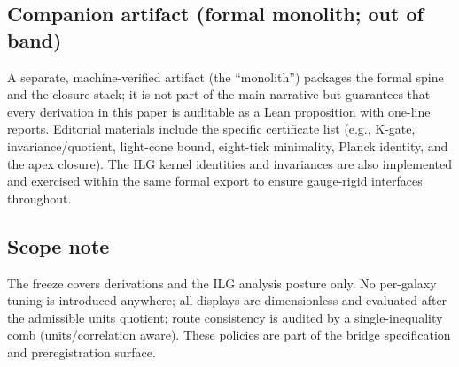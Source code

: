 \documentclass[11pt]{article}
\begin{document}
\subsection*{Companion artifact (formal monolith; out of band)}
A separate, machine-verified artifact (the ``monolith'') packages the formal spine and the closure stack; it is not part of the main narrative but guarantees that every derivation in this paper is auditable as a Lean proposition with one-line reports. Editorial materials include the specific certificate list (e.g., K-gate, invariance/quotient, light-cone bound, eight-tick minimality, Planck identity, and the apex closure).  The ILG kernel identities and invariances are also implemented and exercised within the same formal export to ensure gauge-rigid interfaces throughout. 

\subsection*{Scope note}
The freeze covers derivations and the ILG analysis posture only. No per-galaxy tuning is introduced anywhere; all displays are dimensionless and evaluated after the admissible units quotient; route consistency is audited by a single-inequality comb (units/correlation aware). These policies are part of the bridge specification and preregistration surface.  
\end{document}
